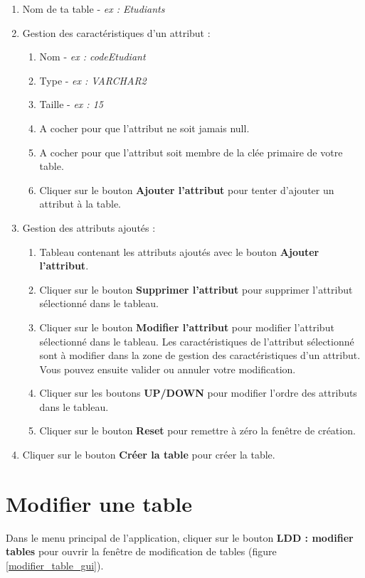 \begin{enumerate}
\item Nom de ta table - \textit{ex : Etudiants}

\item Gestion des caractéristiques d'un attribut :
\begin{enumerate}
\item Nom - \textit{ex : codeEtudiant}
\item Type - \textit{ex : VARCHAR2}
\item Taille - \textit{ex : 15}
\item A cocher pour que l'attribut ne soit jamais null.
\item A cocher pour que l'attribut soit membre de la clée primaire de votre table.
\item Cliquer sur le bouton \textbf{Ajouter l'attribut} pour tenter d'ajouter un attribut à la table.
\end{enumerate}

\item Gestion des attributs ajoutés :
\begin{enumerate}
\item Tableau contenant les attributs ajoutés avec le bouton \textbf{Ajouter l'attribut}.
\item Cliquer sur le bouton \textbf{Supprimer l'attribut} pour supprimer l'attribut sélectionné dans le tableau.
\item Cliquer sur le bouton \textbf{Modifier l'attribut} pour modifier l'attribut sélectionné dans le tableau. 
Les caractéristiques de l'attribut sélectionné sont à modifier dans la zone de gestion des caractéristiques d'un attribut. 
Vous pouvez ensuite valider ou annuler votre modification.
\item Cliquer sur les boutons \textbf{UP/DOWN} pour modifier l'ordre des attributs dans le tableau. 
\item Cliquer sur le bouton \textbf{Reset} pour remettre à zéro la fen\^etre de création.
\end{enumerate}

\item Cliquer sur le bouton \textbf{Créer la table} pour créer la table.
\end{enumerate}


\section{Modifier une table}
Dans le menu principal de l'application, cliquer sur le bouton \textbf{LDD : modifier tables} pour ouvrir la fenêtre de modification de tables (figure \ref{modifier_table_gui}).


